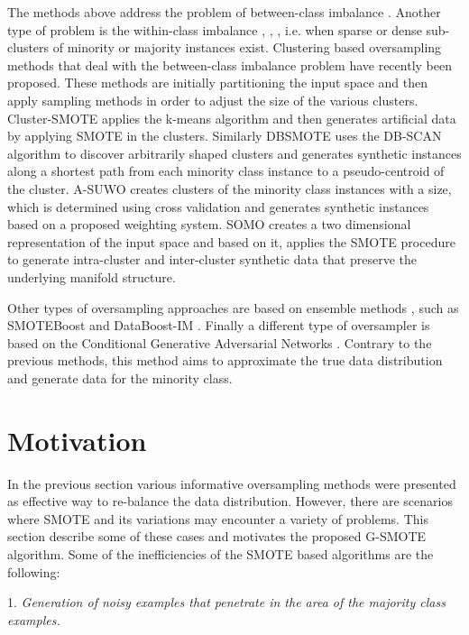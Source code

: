 \documentclass[parskip=full]{scrartcl}
\begin{document}
The methods above address the problem of between-class imbalance \cite{Nekooeimehr2016}. Another type of problem is the within-class imbalance  \cite{Nekooeimehr2016}, \cite{Bunkhumpornpat2012}, \cite{Cieslak2008}, \cite{Jo2004} i.e. when sparse or dense sub-clusters of minority or majority instances exist.  Clustering based oversampling methods that deal with the between-class imbalance problem have recently been proposed. These methods are initially partitioning the input space and then apply sampling methods in order to adjust the size of the various clusters. Cluster-SMOTE \cite{Cieslak2006} applies the k-means algorithm and then generates artificial data by applying SMOTE in the clusters. Similarly DBSMOTE \cite{Bunkhumpornpat2012} uses the DB-SCAN algorithm to discover arbitrarily shaped clusters and generates synthetic instances along a shortest path from each minority class instance to a pseudo-centroid of the cluster. A-SUWO \cite{Nekooeimehr2016} creates clusters of the minority class instances with a size, which is determined using cross validation and generates synthetic instances based on a proposed weighting system. SOMO \cite{Douzas2017} creates a two dimensional representation of the input space and based on it, applies the SMOTE procedure to generate intra-cluster and inter-cluster synthetic data that preserve the underlying manifold structure. 

Other types of oversampling approaches are based on ensemble methods \cite{Wang2015}, \cite{Sun2015} such as SMOTEBoost \cite{Chawla2003} and DataBoost-IM \cite{Guo2004}. Finally a different type of oversampler is based on the Conditional Generative Adversarial Networks \cite{Douzas2017}. Contrary to the previous methods, this method aims to approximate the true data distribution and generate data for the minority class.

\section{Motivation}
In the previous section various informative oversampling methods were presented as effective way to re-balance the data distribution. However, there are scenarios where SMOTE and its variations may encounter a variety of problems. This section describe some of these cases and motivates the proposed G-SMOTE algorithm. Some of the inefficiencies of the SMOTE based algorithms are the following:  

1. \textit{Generation of noisy examples that penetrate in the area of the majority class examples.}
\end{document}
